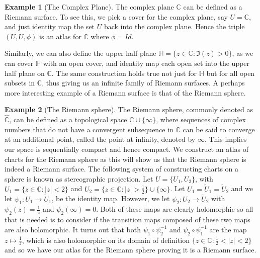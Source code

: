 \documentclass[11pt]{report}
\theoremstyle{definition}
\newtheorem*{example*}{Example}
\begin{document}
\begin{example*}[The Complex Plane]
  The complex plane $\mathbb{C}$ can be defined as a Riemann surface. To see this, we pick a cover for the complex plane, say $U = \mathbb{C}$, and just identity map the set $U$ back into the complex plane. Hence the triple $(U,U,\phi)$ is an atlas for $\mathbb{C}$ where $\phi=Id$.
\end{example*}
Similarly, we can also define the upper half plane $\mathbb{H}=\{ z \in \mathbb{C} \colon \Im(z)>0\}$, as we can cover $\mathbb{H}$ with an open cover, and identity map each open set into the upper half plane on $\mathbb{C}$. The same construction holds true not just for $\mathbb{H}$ but for all open subsets in $\mathbb{C}$, thus giving us an infinite family of Riemann surfaces. A perhaps more interesting example of a Riemann surface is that of the Riemann sphere.

\begin{example*}[The Riemann sphere]
  The Riemann sphere, commonly denoted as $\widehat{\mathbb{C}}$, can be defined as a topological space $\mathbb{C} \cup \{\infty\}$, where sequences of complex numbers that do not have a convergent subsequence in $\mathbb{C}$ can be said to converge at an additional point, called the point at infinity, denoted by $\infty$. This implies our space is sequentially compact and hence compact. We construct an atlas of charts for the Riemann sphere as this will show us that the Riemann sphere is indeed a Riemann surface. The following system of constructing charts on a sphere is known as stereographic projection. Let $U=\{U_1,U_2\}$, with $U_1=\{z \in \mathbb{C} : |z| < 2\}$ and $U_2=\{z \in \mathbb{C} : |z| > \frac{1}{2}\}\cup \{\infty\}$. Let $U_1=\widetilde{U}_1=\widetilde{U}_2$ and we let $\psi_1:U_1 \rightarrow \widetilde{U}_1$, be the identity map. However, we let $\psi_2:U_2 \rightarrow \widetilde{U}_2$ with $\psi_2(z)=\frac{1}{z}$ and $\psi_2(\infty)=0$. Both of these maps are clearly holomorphic so all that is needed is to consider if the transition maps composed of these two maps are also holomorphic.
  It turns out that both $\psi_1 \circ \psi_2 ^{-1}$ and $\psi_2 \circ \psi_1 ^{-1}$ are the map $z \mapsto \frac{1}{z}$, which is also holomorphic on its domain of definition $\{z\in \mathbb{C} : \frac{1}{2} < |z| < 2\}$ and so we have our atlas for the Riemann sphere proving it is a Riemann surface.
\end{example*}
\end{document}
